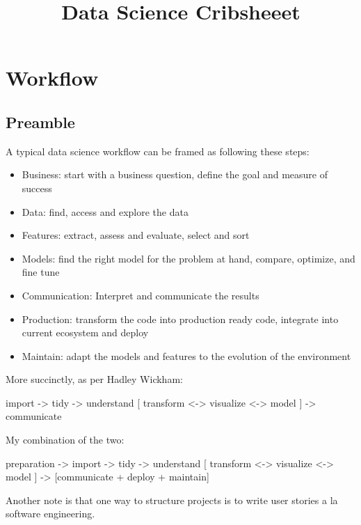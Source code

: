 \documentclass[]{book}
\title{Data Science Cribsheeet}
\author{}
\date{}
\theoremstyle{definition}
\theoremstyle{definition}
\theoremstyle{definition}
\theoremstyle{remark}
\begin{document}
\maketitle

{
\setcounter{tocdepth}{1}
\tableofcontents
}
\chapter{Workflow}\label{workflow}

\section{Preamble}\label{preamble}

A typical data science workflow can be framed as following these steps:

\begin{itemize}
\item
  Business: start with a business question, define the goal and measure
  of success
\item
  Data: find, access and explore the data
\item
  Features: extract, assess and evaluate, select and sort
\item
  Models: find the right model for the problem at hand, compare,
  optimize, and fine tune
\item
  Communication: Interpret and communicate the results
\item
  Production: transform the code into production ready code, integrate
  into current ecosystem and deploy
\item
  Maintain: adapt the models and features to the evolution of the
  environment
\end{itemize}

More succinctly, as per Hadley Wickham:

import -\textgreater{} tidy -\textgreater{} understand {[} transform
\textless{}-\textgreater{} visualize \textless{}-\textgreater{} model
{]} -\textgreater{} communicate

My combination of the two:

preparation -\textgreater{} import -\textgreater{} tidy -\textgreater{}
understand {[} transform \textless{}-\textgreater{} visualize
\textless{}-\textgreater{} model {]} -\textgreater{} {[}communicate +
deploy + maintain{]}

Another note is that one way to structure projects is to write user
stories a la software engineering.
\end{document}
